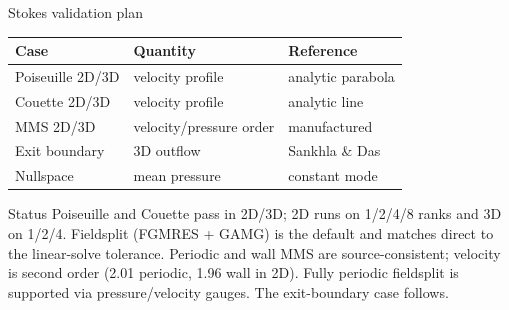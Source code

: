 \documentclass[aspectratio=169,10pt]{beamer}
\begin{document}
\begin{frame}{Stokes validation plan}
  \begin{center}
    \small
    \begin{tabular}{lll}
      \toprule
      Case & Quantity & Reference \\
      \midrule
      Poiseuille 2D/3D & velocity profile & analytic parabola \\
      Couette 2D/3D & velocity profile & analytic line \\
      MMS 2D/3D & velocity/pressure order & manufactured \\
      Exit boundary & 3D outflow & Sankhla \& Das \cite{sankhla2025} \\
      Nullspace & mean pressure & constant mode \\
      \bottomrule
    \end{tabular}
  \end{center}

  \begin{block}{Status}
    Poiseuille and Couette pass in 2D/3D; 2D runs on 1/2/4/8 ranks and 3D on
    1/2/4. Fieldsplit (FGMRES + GAMG) is the default and matches direct to the
    linear-solve tolerance. Periodic and wall MMS are source-consistent;
    velocity is second order (2.01 periodic, 1.96 wall in 2D). Fully periodic
    fieldsplit is supported via pressure/velocity gauges. The exit-boundary
    case follows.
  \end{block}
\end{frame}
\end{document}
